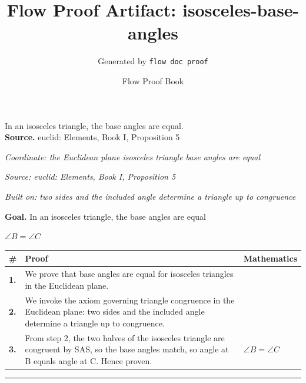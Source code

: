 \documentclass[11pt]{article}
\title{Flow Proof Artifact: isosceles-base-angles}
\author{Generated by \texttt{flow doc proof}}
\date{Flow Proof Book}
\theoremstyle{definition}
\begin{document}
\maketitle
In an isosceles triangle, the base angles are equal.\\[0.5em]
\textbf{Source.} euclid: Elements, Book I, Proposition 5\\[0.5em]
\bigskip
{}\par
\smallskip\noindent\textit{Coordinate: the Euclidean plane \cdot isosceles triangle \cdot base angles are equal}\par
\smallskip\noindent\textit{Source: euclid: Elements, Book I, Proposition 5}\par
\smallskip\noindent\textit{Built on: two sides and the included angle determine a triangle up to congruence}\par
\medskip
\noindent\textbf{Goal.} In an isosceles triangle, the base angles are equal\par
\noindent$\displaystyle \angle B = \angle C$\par
\medskip
\noindent
\begin{tabular}{@{} >{\raggedright\arraybackslash}p{} >{\raggedright\arraybackslash}p{} >{\raggedleft\arraybackslash}p{} @{}}
\textbf{\#} & \textbf{Proof} & \textbf{Mathematics} \\
\midrule
\textbf{1.} & We prove that base angles are equal for isosceles triangles in the Euclidean plane. & \\[0.45em]
\textbf{2.} & We invoke the axiom governing triangle congruence in the Euclidean plane: two sides and the included angle determine a triangle up to congruence. & \\[0.45em]
\textbf{3.} & From step 2, the two halves of the isosceles triangle are congruent by SAS, so the base angles match, so angle at B equals angle at C. Hence proven. & $\displaystyle \angle B = \angle C$ \\[0.45em]
\bottomrule
\end{tabular}
\label{thm:Geometry-isosceles triangle-base_angles_are_equal}
\par\medskip\hrule
\end{document}
